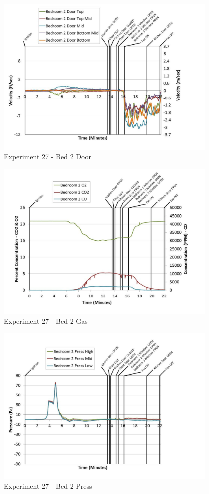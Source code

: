 \documentclass{article}
\begin{document}
\begin{appendices}
	\clearpage

	\begin{figure}[h!]
		\centering
		\includegraphics[height=3.05in]{0_Images/Results_Charts/Exp_27_Charts/Bed2Door.pdf}
		\caption{Experiment 27 - Bed 2 Door}
	\end{figure}
 

	\begin{figure}[h!]
		\centering
		\includegraphics[height=3.05in]{0_Images/Results_Charts/Exp_27_Charts/Bed2Gas.pdf}
		\caption{Experiment 27 - Bed 2 Gas}
	\end{figure}
 
	\clearpage

	\begin{figure}[h!]
		\centering
		\includegraphics[height=3.05in]{0_Images/Results_Charts/Exp_27_Charts/Bed2Press.pdf}
		\caption{Experiment 27 - Bed 2 Press}
	\end{figure}
 


\end{appendices}
\end{document}
